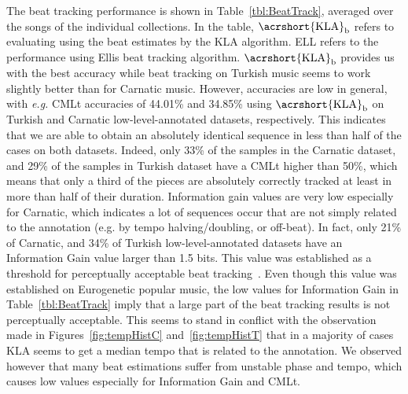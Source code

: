 The beat tracking performance is shown in Table~\ref{tbl:BeatTrack}, averaged over the songs of the individual collections. In the table, $\mathrm{\acrshort{KLA}}_{\mathrm{b}}$ refers to evaluating using the beat estimates by the \acrshort{KLA} algorithm. \acrshort{ELL} refers to the performance using Ellis beat tracking algorithm. $\mathrm{\acrshort{KLA}}_{\mathrm{b}}$ provides us with the best accuracy while beat tracking on Turkish music seems to work slightly better than for Carnatic music. However, accuracies are low in general, with \textit{e.g.} CMLt accuracies of 44.01\% and 34.85\% using $\mathrm{\acrshort{KLA}}_{\mathrm{b}}$ on Turkish and Carnatic low-level-annotated datasets, respectively. This indicates that we are able to obtain an absolutely identical sequence in less than half of the cases on both datasets. Indeed, only 33\% of the samples in the Carnatic dataset, and 29\% of the samples in Turkish dataset have a CMLt higher than 50\%, which means that only a third of the pieces are absolutely correctly tracked at least in more than half of their duration. Information gain values are very low especially for Carnatic, which indicates a lot of sequences occur that are not simply related to the annotation (e.g. by tempo halving/doubling, or off-beat). In fact, only 21\% of Carnatic, and 34\% of Turkish low-level-annotated datasets have an Information Gain value larger than 1.5 bits. This value was established as a threshold for perceptually acceptable beat tracking~\cite{zapata:12:beat}. Even though this value was established on Eurogenetic popular music, the low values for Information Gain in Table~\ref{tbl:BeatTrack} imply that a large part of the beat tracking results is not perceptually acceptable. This seems to stand in conflict with the observation made in Figures~\ref{fig:tempHistC} and~\ref{fig:tempHistT} that in a majority of cases \acrshort{KLA} seems to get a median tempo that is related to the annotation. We observed however that many beat estimations suffer from unstable phase and tempo, which causes low values especially for Information Gain and CMLt. 

